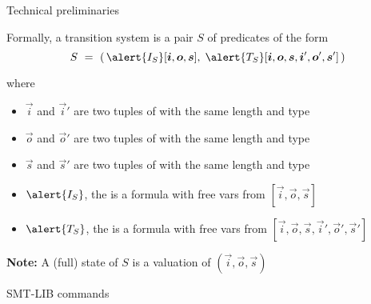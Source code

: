 \documentclass[10pt,aspectratio=149]{beamer}
\begin{document}
\begin{frame}{Technical preliminaries}

Formally, a transition system is a pair $S$ of predicates of the form
{\large
\[
 S \ = \ (\,
 \alert{I_S}[\vec i,\vec o,\vec s],\;
 \alert{T_S}[\vec i,\vec o,\vec s, \vec i',\vec o',\vec s']\,
 )
\]
}
\pause

where 
\begin{itemize}
\item 
$\vec i$ and $\vec i'$ are two tuples of  with the same length and type
\item 
$\vec o$ and $\vec o'$ are two tuples of  with the same length and type
\item 
$\vec s$ and $\vec s'$ are two tuples of  with the same length and type
\item 
$\alert{I_S}$, the  is a formula with free vars from $[\vec i,\vec o,\vec s]$ 
\item
$\alert{T_S}$, the  is a formula with free vars from $[\vec i,\vec o,\vec s, \vec i',\vec o',\vec s']$
\end{itemize}
\bigskip

\pause
\textbf{Note:}
A (full) state of $S$ is a valuation of $(\vec i,\vec o,\vec s)$
\end{frame}


\begin{frame}[t]{SMT-LIB commands}
\vspace{5ex}



\end{frame}
\end{document}

